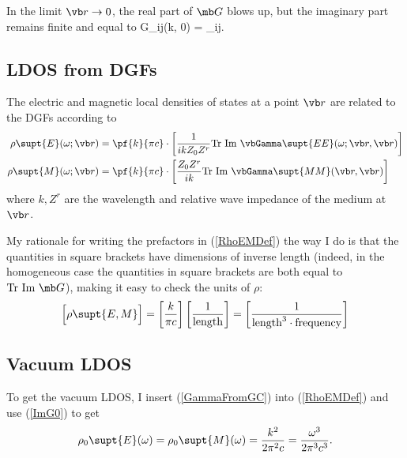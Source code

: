 \documentclass[letterpaper]{article}
\begin{document}
In the limit $\vb r\to 0$, the real part of $\mb G$ blows up,
but the imaginary part remains finite and equal to
{ \mb G_{ij}(k, 0) =
  \delta_{ij}.
}

\subsection*{LDOS from DGFs}

The electric and magnetic local densities of states at a point $\vb r$
are related to the DGFs according to
\begin{subequations}
\begin{align}
 \rho\supt{E}(\omega; \vb r) &=
\pf{k}{\pi c}\cdot
\left[
\frac{1}{ikZ_0 Z^r}
   \text{Tr }\text{Im }\vbGamma\supt{EE}(\omega; \vb r, \vb r)
\right]
\\
 \rho\supt{M}(\omega; \vb r) &=
\pf{k}{\pi c}\cdot
\left[
\frac{Z_0 Z^r}{ik}
\text{Tr }\text{Im }\vbGamma\supt{MM}(\vb r, \vb r)
\right]
\end{align}
\label{RhoEMDef}
\end{subequations}
where $k,Z^r$ are the wavelength and relative wave impedance
of the medium at $\vb r$.

My rationale for writing the prefactors in (\ref{RhoEMDef}) the way I do
is that the quantities in square brackets have dimensions of inverse length
(indeed, in the homogeneous case the quantities in square brackets
are both equal to $\text{Tr }\text{Im }\mb G$), making it easy to
check the units of $\rho$:
$$\Big[\rho\supt{E,M}\Big]
  =
  \left[\frac{k}{\pi c}\right]
  \left[\frac{1}{\text{length}}\right]
  =\left[\frac{1}{\text{length}^3\cdot\text{frequency}}\right]
$$

\subsection*{Vacuum LDOS}

To get the vacuum LDOS, I insert (\ref{GammaFromGC}) into (\ref{RhoEMDef})
and use (\ref{ImG0}) to get
$$ \rho_0\supt{E}(\omega)=\rho_0\supt{M}(\omega)=
   \frac{k^2}{2\pi^2 c}=\frac{\omega^3}{2\pi^3 c^3}.
$$
\end{document}
